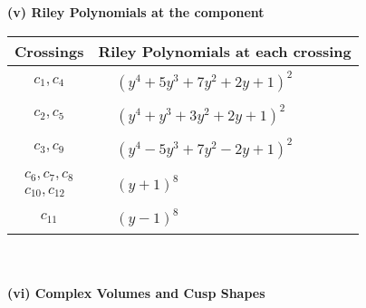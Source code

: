 \documentclass[1p]{elsarticle_modified}
\theoremstyle{definition}
\begin{document}
\newpage\renewcommand{\arraystretch}{1}
\flushleft \textbf{(v) Riley Polynomials at the component}\newline \\
\begin{tabular}{m{50pt}|m{274pt}}
Crossings & \hspace{64pt}Riley Polynomials at each crossing \\
\hline $$\begin{aligned}c_{1},c_{4}\end{aligned}$$&$\begin{aligned}
&(y^4+5 y^3+7 y^2+2 y+1)^2
\end{aligned}$\\
\hline $$\begin{aligned}c_{2},c_{5}\end{aligned}$$&$\begin{aligned}
&(y^4+y^3+3 y^2+2 y+1)^2
\end{aligned}$\\
\hline $$\begin{aligned}c_{3},c_{9}\end{aligned}$$&$\begin{aligned}
&(y^4-5 y^3+7 y^2-2 y+1)^2
\end{aligned}$\\
\hline $$\begin{aligned}c_{6},c_{7},c_{8}\\c_{10},c_{12}\end{aligned}$$&$\begin{aligned}
&(y+1)^8
\end{aligned}$\\
\hline $$\begin{aligned}c_{11}\end{aligned}$$&$\begin{aligned}
&(y-1)^8
\end{aligned}$\\
\hline
\end{tabular}\\~\\
\newpage\flushleft \textbf{(vi) Complex Volumes and Cusp Shapes}
\end{document}
